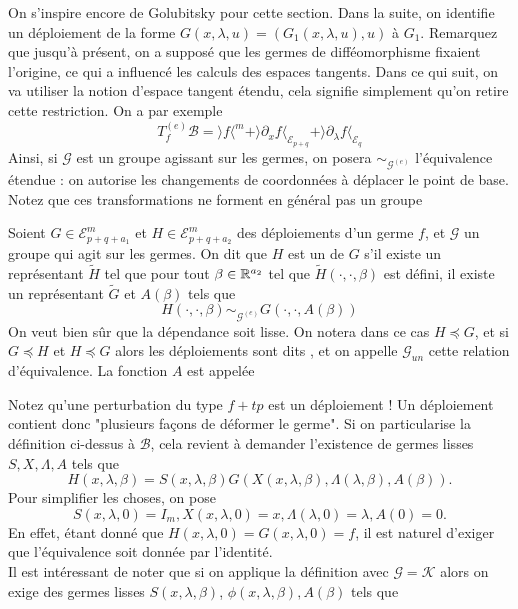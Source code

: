 \documentclass[memoire.tex]{subfiles}
\begin{document}
On s'inspire encore de Golubitsky 
\cite{golubitsky1988sgb2} pour cette 
section. Dans la suite, on identifie un déploiement de la forme 
$G(x,\lambda,u)=(G_1(x,\lambda,u),u)$ à $G_1$. 
Remarquez que jusqu'à 
présent, on a supposé que les 
germes de difféomorphisme 
fixaient l'origine, ce 
qui a influencé les calculs 
des espaces tangents. Dans ce qui suit, on va utiliser la notion d'espace tangent étendu, cela signifie simplement qu'on retire cette restriction. On a par exemple
\begin{equation*}
    T^{(e)}_f\mathcal{B}=\rangle f\langle^m+\rangle 
    \partial_{x}f\langle
    _{\mathcal{E}_{p+q}}+ 
    \rangle \partial_{\lambda}f\langle_{\mathcal{E}_q}
\end{equation*}
Ainsi, si $\mathcal{G}$ est un groupe agissant sur les germes, on posera $\sim_{\mathcal{G}^{(e)}}$ l'équivalence étendue : on autorise les changements de coordonnées à déplacer le point de base. Notez que ces transformations ne forment en général pas un groupe
\begin{definition}
    Soient $G\in\mathcal{E}_{p+q+a_1}^m$ et $H\in\mathcal{E}_{p+q+a_2}^m$ des déploiements d'un germe $f$, et $\mathcal{G}$ un groupe qui agit sur les germes. On dit que $H$ est un  de $G$   s'il existe un représentant 
    $\tilde{H}$ tel que pour tout $\beta\in \mathbb{R}^{a_2}$ tel que
    $\tilde{H}(\cdot,\cdot,\beta)$ est défini, il existe un représentant $\tilde{G}$ et $A(\beta)$ tels que
    \begin{equation}\label{def-fact}
        H(\cdot,\cdot,\beta)
        \sim_{\mathcal{G}^{(e)}} G(\cdot,\cdot,A(\beta))
    \end{equation}
    On veut bien sûr que la dépendance soit lisse. On notera dans ce cas $H \preccurlyeq G$, et si $G \preccurlyeq H$ et $H \preccurlyeq G$ alors les déploiements sont dits , et on appelle 
    $\mathcal{G}_{un}$ cette relation d'équivalence. La fonction $A$ est appelée 
\end{definition}

Notez qu'une perturbation du type $f+tp$ est un déploiement ! Un déploiement contient donc "plusieurs façons de déformer le germe". Si on particularise la définition ci-dessus à $\mathcal{B}$, cela revient à demander l'existence de germes lisses $S,X,\Lambda, A$ tels que
\begin{equation}\label{Factor-unfold}
    H(x,\lambda,\beta)=S(x,\lambda,\beta)G(X(x,\lambda,\beta),\Lambda(\lambda,\beta),A(\beta)).
\end{equation}
Pour simplifier les choses, on pose 
\begin{equation*}
    S(x,\lambda,0)=I_m,X(x,\lambda,0)=x,\Lambda(\lambda,0)=\lambda,A(0)=0.
\end{equation*}
En effet, étant donné que $H(x,\lambda,0)=G(x,\lambda,0)=f$, il est 
naturel d'exiger que l'équivalence 
soit donnée par l'identité.\\
Il est intéressant de noter que si on applique la définition avec $\mathcal{G}=\mathcal{K}$ alors on exige des germes lisses $S(x,\lambda,\beta)$, $\phi(x,\lambda,\beta),A(\beta)$ tels que
\end{document}
